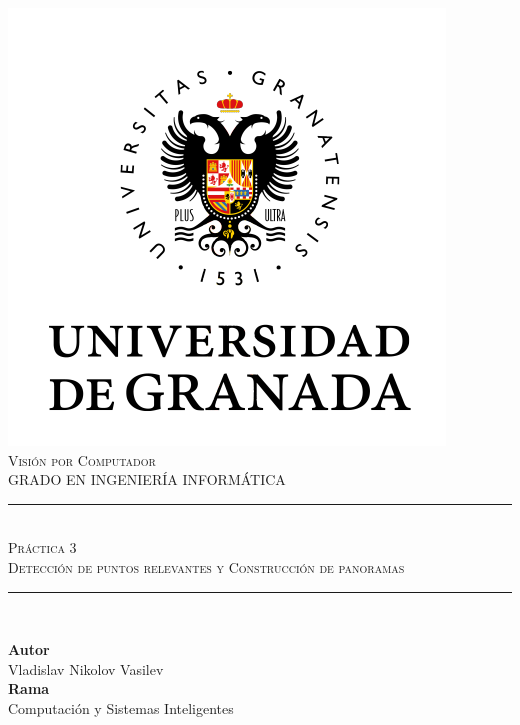 \documentclass[11pt,a4paper]{article}
\newcommand{\asignatura}{Visión por Computador}
\newcommand{\autor}{Vladislav Nikolov Vasilev}
\newcommand{\titulo}{Práctica 3}
\newcommand{\subtitulo}{Detección de puntos relevantes y Construcción de panoramas}
\begin{document}

\begin{titlepage}

\begin{minipage}{\textwidth}

\centering

\includegraphics[scale=0.5]{img/ugr.png}\\

\textsc{\Large \asignatura{}\\[0.2cm]}
\textsc{GRADO EN INGENIERÍA INFORMÁTICA}\\[1cm]

\noindent\rule[-1ex]{\textwidth}{1pt}\\[1.5ex]
\textsc{{\Huge \titulo\\[0.5ex]}}
\textsc{{\large \subtitulo\\}}
\noindent\rule[-1ex]{\textwidth}{2pt}\\[3.5ex]

\end{minipage}

\vspace{0.5cm}

\begin{minipage}{\textwidth}

\centering

\textbf{Autor}\\ {\autor{}}\\[2.5ex]
\textbf{Rama}\\ {Computación y Sistemas Inteligentes}\\[2.5ex]
\vspace{0.3cm}


\end{minipage}
\end{titlepage}
\end{document}
